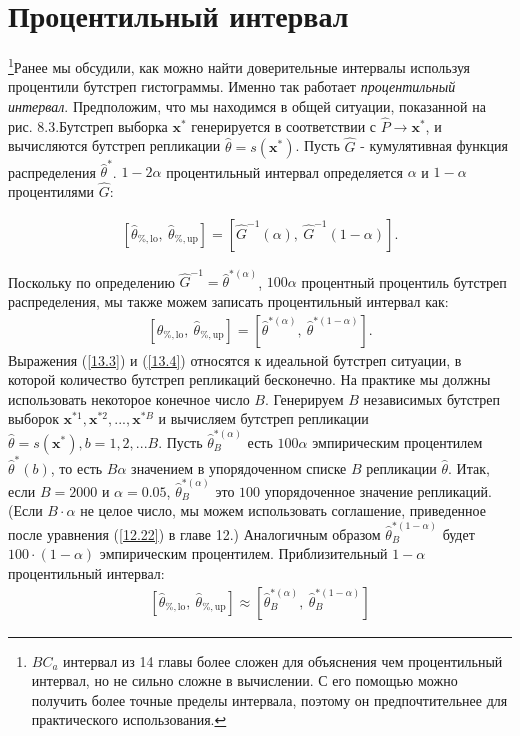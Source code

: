 \section{Процентильный интервал}
\footnote{$BC_{a}$ интервал из 14 главы более сложен для объяснения чем процентильный интервал, но не сильно сложне в вычислении. С его помощью можно получить более точные пределы интервала, поэтому он предпочтительнее для практического использования.}Ранее мы обсудили, как можно найти доверительные интервалы используя процентили бутстреп гистограммы. Именно так работает \textit{процентильный интервал}. Предположим, что мы находимся в общей ситуации, показанной на рис. 8.3.Бутстреп выборка $\textbf{x}^{*}$ генерируется в соответствии с $\widehat{P} \rightarrow \textbf{x}^{*}$, и вычисляются бутстреп репликации $\widehat{\theta} = s(\textbf{x}^{*})$. Пусть $\widehat{G}$ - кумулятивная функция распределения $\widehat{\theta}^{*}$. $1-2\alpha$ процентильный интервал определяется $\alpha$ и $1 - \alpha$ процентилями  $\widehat{G}$:

\begin{gather}\label{13.3}
[\widehat{\theta}_{\%, \text{lo}},\  \widehat{\theta}_{\%, \text{up}}] = [\widehat{G}^{-1}(\alpha),\ \widehat{G}^{-1}(1 - \alpha)].
\end{gather}

Поскольку по определению $\widehat{G}^{-1} = \widehat{\theta}^{*(\alpha)}$, $100\alpha$ процентный процентиль бутстреп распределения, мы также можем записать процентильный интервал как:
\begin{gather}\label{13.4}
[\widehat{\theta}_{\%, \text{lo}},\  \widehat{\theta}_{\%, \text{up}}] = [\widehat{\theta}^{*(\alpha)},\ \widehat{\theta}^{*(1 - \alpha)}].
\end{gather}
Выражения (\ref{13.3}) и (\ref{13.4}) относятся к идеальной бутстреп ситуации, в которой количество бутстреп репликаций бесконечно. На практике мы должны использовать некоторое конечное число $B$. Генерируем $B$ независимых бутстреп выборок $\textbf{x}^{*1}, \textbf{x}^{*2},...,\textbf{x}^{*B}$ и вычисляем бутстреп репликации $\widehat{\theta} = s(\textbf{x}^{*}), b = 1, 2, ... B$. Пусть $\widehat{\theta}_{B}^{*(\alpha)}$ есть $100\alpha$ эмпирическим процентилем $\widehat{\theta}^{*}(b)$, то есть $B\alpha$ значением в упорядоченном списке
$B$ репликации $\widehat{\theta}$. Итак, если $B = 2000$ и $\alpha = 0.05$, $\widehat{\theta}_{B}^{*(\alpha)}$ это $100$ упорядоченное значение репликаций. (Если $B\cdot \alpha$ не целое число, мы можем использовать соглашение, приведенное после уравнения (\ref{12.22}) в главе 12.) Аналогичным образом $\widehat{\theta}_{B}^{*(1 - \alpha)}$ будет $100\cdot(1-\alpha)$ эмпирическим процентилем. Приблизительный $1 - \alpha$ процентильный интервал:
\begin{gather}\label{13.5}
[\widehat{\theta}_{\%, \text{lo}}, \ \widehat{\theta}_{\%, \text{up}}] \approx [\widehat{\theta}_{B}^{*(\alpha)}, \ \widehat{\theta}_{B}^{*(1 - \alpha)}] 
\end{gather}

